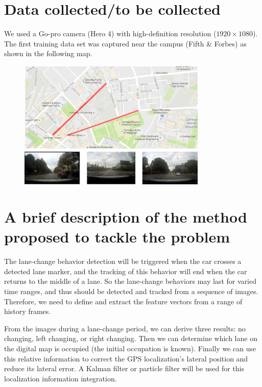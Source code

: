 \documentclass[letterpaper,11pt]{article}
\begin{document}
\section{Data collected/to be collected}

We used a Go-pro camera (Hero 4) with high-definition resolution ($1920 \times 1080$). The first training data set was captured near the campus (Fifth \& Forbes) as shown in the following map.

\begin{figure}[!ht]
	\centering
	\includegraphics[width=0.8\textwidth]{./img/exp.png}
\end{figure}

\section{A brief description of the method proposed to tackle the problem}

The lane-change behavior detection will be triggered when the car crosses a detected lane marker, and the tracking of this behavior will end when the car returns to the middle of a lane. So the lane-change behaviors may last for varied time ranges, and thus should be detected and tracked from a sequence of images. Therefore, we need to define and extract the feature vectors from a range of history frames.

From the images during a lane-change period, we can derive three results: no changing, left changing, or right changing. Then we can determine which lane on the digital map is occupied (the initial occupation is known). Finally we can use this relative information to correct the GPS localization's lateral position and reduce its lateral error. A Kalman filter or particle filter will be used for this localization information integration.
\end{document}
